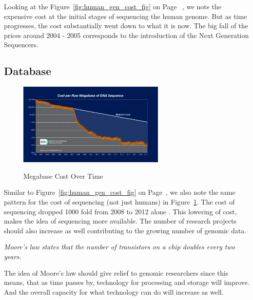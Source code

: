 \documentclass{article}
\begin{document}
Looking at the Figure~\ref{fig:human_gen_cost_fig} on Page~\pageref{fig:human_gen_cost_fig} \autocite{genomics-cost}, we note the expensive cost at the initial stages of sequencing the human genome. But as time progresses, the cost substantially went down to what it is now. The big fall of the prices around 2004 - 2005 corresponds to the introduction of the Next Generation Sequencers.

\subsection{Database}

\begin{figure}[h]
\caption{Megabase Cost Over Time}
\centering
\includegraphics[width=0.65\textwidth]{images/seq-cost.jpeg} 
\label{fig:megabase_cost_fig}
\end{figure}

Similar to Figure~\ref{fig:human_gen_cost_fig} on Page~\pageref{fig:human_gen_cost_fig}, we also note the same pattern for the cost of sequencing (not just humans) in Figure~\ref{fig:megabase_cost_fig}\autocite{genomics-cost}. The cost of sequencing dropped 1000 fold from 2008 to 2012 alone \autocite{bon_compression}. This lowering of cost, makes the idea of sequencing more available. The number of  research projects should also increase as well contributing to the growing number of genomic data.
 
\begin{center}
\textit{Moore's law states that the number of transistors on a chip doubles every two years.}
\end{center}


The idea of Moore's law should give relief to genomic researchers since this means, that as time passes by, technology for processing and storage will improve. And the overall capacity for what technology can do will increase as well. 
\end{document}
